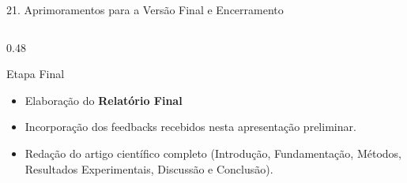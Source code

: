 \documentclass[aspectratio=169, 10pt]{beamer}
\begin{document}
\begin{frame}{21. Aprimoramentos para a Versão Final e Encerramento}
\begin{columns}[T]
        \begin{column}{0.48\textwidth}
            \begin{exampleblock}{Etapa Final }%
                \begin{itemize}\setlength{\itemsep}{5pt}\small
                    \item Elaboração do \textbf{Relatório Final}%
                    \item Incorporação dos feedbacks recebidos nesta apresentação preliminar.
                    \item Redação do artigo científico completo (Introdução, Fundamentação, Métodos, Resultados Experimentais, Discussão e Conclusão).
                \end{itemize}
            \end{exampleblock}

        \end{column}
    \end{columns}
\end{frame}
\end{document}
